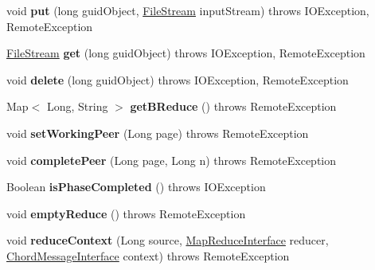 \begin{DoxyCompactItemize}
void {\bfseries put} (long guid\+Object, \mbox{\hyperlink{class_file_stream}{File\+Stream}} input\+Stream)  throws I\+O\+Exception, Remote\+Exception
\item 
\mbox{\label{interface_chord_message_interface_a7e5c3d20f8555538899989d1984ce326}} 
\mbox{\hyperlink{class_file_stream}{File\+Stream}} {\bfseries get} (long guid\+Object)  throws I\+O\+Exception, Remote\+Exception
\item 
\mbox{\label{interface_chord_message_interface_a2bd41258d7f62c5959907e4d3170fc70}} 
void {\bfseries delete} (long guid\+Object)  throws I\+O\+Exception, Remote\+Exception
\item 
\mbox{\label{interface_chord_message_interface_ad3133122275f2af3985da857a55ccffc}} 
Map$<$ Long, String $>$ {\bfseries get\+B\+Reduce} ()  throws Remote\+Exception
\item 
\mbox{\label{interface_chord_message_interface_ab6c24846cee4bedc76ea464b0a115223}} 
void {\bfseries set\+Working\+Peer} (Long page)  throws Remote\+Exception
\item 
\mbox{\label{interface_chord_message_interface_ad6e76a8f771acad5a559c991b686fbbc}} 
void {\bfseries complete\+Peer} (Long page, Long n)  throws Remote\+Exception
\item 
\mbox{\label{interface_chord_message_interface_a90bc99e8353719eb8fc11083c5b77220}} 
Boolean {\bfseries is\+Phase\+Completed} ()  throws I\+O\+Exception
\item 
\mbox{\label{interface_chord_message_interface_aa04d12dfb770bbc0d0bd63888c20c7cd}} 
void {\bfseries empty\+Reduce} ()  throws Remote\+Exception
\item 
\mbox{\label{interface_chord_message_interface_a21ccb7a25ff36291b3fbdeba29234cd3}} 
void {\bfseries reduce\+Context} (Long source, \mbox{\hyperlink{interface_map_reduce_interface}{Map\+Reduce\+Interface}} reducer, \mbox{\hyperlink{interface_chord_message_interface}{Chord\+Message\+Interface}} context)  throws Remote\+Exception

\end{DoxyCompactItemize}
